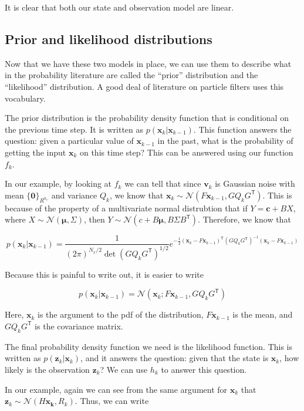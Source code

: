 \documentclass{article}
\newcommand{\tr}{^\mathsf{T}}
\begin{document}
It is clear that both our state and observation model are linear.

\subsection{Prior and likelihood distributions}

Now that we have these two models in place, we can use them to describe what
in the probability literature are called the ``prior'' distribution and the
``likelihood'' distribution.  A good deal of literature on particle filters 
uses this vocabulary.

The prior distribution is the probability density function that is conditional
on the previous time step.  It is written as 
$p(\mathbf{x}_k|\mathbf{x}_{k-1})$.  This function answers the question: 
given a particular value of $\mathbf{x}_{k-1}$ in the past, what is the 
probability of getting the input $\mathbf{x}_k$ on this time step?  
This can be answered using our function $f_k$.  

In our example, by looking at $f_k$ we can tell that since 
$\mathbf{v}_k$ is Gaussian noise with mean $\{\mathbf{0}\}_{R^{n_v}}$ 
and variance 
$Q_k$, we know that $\mathbf{x}_k \sim \mathcal{N}(F\mathbf{x}_{k-1},GQ_kG\tr)$.
This is because of the property of a multivariate normal distrubtion that if
$Y = \mathbf{c} + BX$, where 
$X \sim \mathcal{N}(\mathbf{\mu}, \Sigma)$, then 
$Y \sim \mathcal{N}(c + B\mathbf{\mu},B\Sigma B\tr)$.  Therefore, we know that

\[p(\mathbf{x}_k|\mathbf{x}_{k-1}) = \frac{1}{(2\pi)^{N_x/2} \det(GQ_kG\tr)^{1/2}} 
e^{-\frac{1}{2}(\mathbf{x}_k - F\mathbf{x}_{k-1})\tr(GQ_kG\tr)^{-1}(\mathbf{x}_k
- F\mathbf{x}_{k-1})} \]

Because this is painful to write out, it is easier to write

\[p(\mathbf{x}_k|\mathbf{x}_{k-1}) = \mathcal{N}(\mathbf{x}_k ; 
F\mathbf{x}_{k-1}, GQ_kG\tr)\]

Here, $\mathbf{x}_k$ is the argument to the pdf of the distribution, 
$F\mathbf{x}_{k-1}$ is the mean, and $GQ_kG\tr$ is the covariance matrix.

The final probability density function we need is the likelihood function.  This
is written as $p(\mathbf{z}_{k} | \mathbf{x}_k)$, and it answers the question:
given that the state is $\mathbf{x}_k$, how likely is the observation
$\mathbf{z}_k$?  We can use $h_k$ to answer this question.

In our example, again we can see from the same argument for $\mathbf{x}_k$
that $\mathbf{z}_k \sim \mathcal{N}(H\mathbf{x_k}, R_k)$.  Thus, we can write
\end{document}
